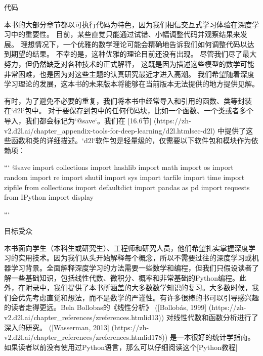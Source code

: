  代码

本书的大部分章节都以可执行代码为特色，因为我们相信交互式学习体验在深度学习中的重要性。
目前，某些直觉只能通过试错、小幅调整代码并观察结果来发展。
理想情况下，一个优雅的数学理论可能会精确地告诉我们如何调整代码以达到期望的结果。
不幸的是，这种优雅的理论目前还没有出现。
尽管我们尽了最大努力，但仍然缺乏对各种技术的正式解释，
这既是因为描述这些模型的数学可能非常困难，也是因为对这些主题的认真研究最近才进入高潮。
我们希望随着深度学习理论的发展，这本书的未来版本将能够在当前版本无法提供的地方提供见解。

有时，为了避免不必要的重复，我们将本书中经常导入和引用的函数、类等封装在`d2l`包中。
对于要保存到包中的任何代码块，比如一个函数、一个类或者多个导入，我们都会标记为`@save`。我们在 [16.6节]
(https://zh-v2.d2l.ai/chapter\_appendix-tools-for-deep-learning/d2l.htmlsec-d2l) 
中提供了这些函数和类的详细描述。`d2l`软件包是轻量级的，仅需要以下软件包和模块作为依赖项：


```
@save
import collections
import hashlib
import math
import os
import random
import re
import shutil
import sys
import tarfile
import time
import zipfile
from collections import defaultdict
import pandas as pd
import requests
from IPython import display

```


 目标受众

本书面向学生（本科生或研究生）、工程师和研究人员，他们希望扎实掌握深度学习的实用技术。因为我们从头开始解释每个概念，所以不需要过往的深度学习或机器学习背景。全面解释深度学习的方法需要一些数学和编程，但我们只假设读者了解一些基础知识，包括线性代数、微积分、概率和非常基础的Python编程。此外，在附录中，我们提供了本书所涵盖的大多数数学知识的复习。大多数时候，我们会优先考虑直觉和想法，而不是数学的严谨性。有许多很棒的书可以引导感兴趣的读者走得更远。Bela Bollobas的《线性分析》 ([Bollobás, 1999]
(https://zh-v2.d2l.ai/chapter\_references/zreferences.htmlid13)) 
对线性代数和函数分析进行了深入的研究。 ([Wasserman, 2013]
(https://zh-v2.d2l.ai/chapter\_references/zreferences.htmlid178))
是一本很好的统计学指南。如果读者以前没有使用过Python语言，那么可以仔细阅读这个[Python教程]


